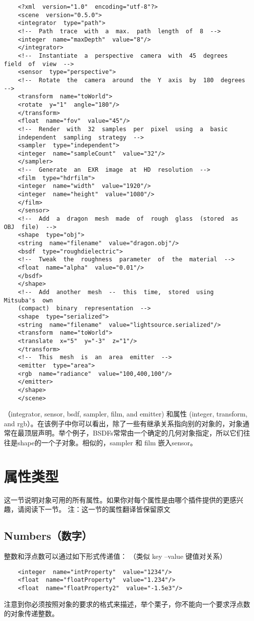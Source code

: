 \begin{lstlisting}
	<?xml  version="1.0"  encoding="utf-8"?>
	<scene  version="0.5.0">
	<integrator  type="path">
	<!--  Path  trace  with  a  max.  path  length  of  8  -->
	<integer  name="maxDepth"  value="8"/>
	</integrator>
	<!--  Instantiate  a  perspective  camera  with  45  degrees  field  of  view  -->
	<sensor  type="perspective">
	<!--  Rotate  the  camera  around  the  Y  axis  by  180  degrees  -->
	<transform  name="toWorld">
	<rotate  y="1"  angle="180"/>
	</transform>
	<float  name="fov"  value="45"/>
	<!--  Render  with  32  samples  per  pixel  using  a  basic
	independent  sampling  strategy  -->
	<sampler  type="independent">
	<integer  name="sampleCount"  value="32"/>
	</sampler>
	<!--  Generate  an  EXR  image  at  HD  resolution  -->
	<film  type="hdrfilm">
	<integer  name="width"  value="1920"/>
	<integer  name="height"  value="1080"/>
	</film>
	</sensor>
	<!--  Add  a  dragon  mesh  made  of  rough  glass  (stored  as  OBJ  file)  -->
	<shape  type="obj">
	<string  name="filename"  value="dragon.obj"/>
	<bsdf  type="roughdielectric">
	<!--  Tweak  the  roughness  parameter  of  the  material  -->
	<float  name="alpha"  value="0.01"/>
	</bsdf>
	</shape>
	<!--  Add  another  mesh  --  this  time,  stored  using  Mitsuba's  own
	(compact)  binary  representation  -->
	<shape  type="serialized">
	<string  name="filename"  value="lightsource.serialized"/>
	<transform  name="toWorld">
	<translate  x="5"  y="-3"  z="1"/>
	</transform>
	<!--  This  mesh  is  an  area  emitter  -->
	<emitter  type="area">
	<rgb  name="radiance"  value="100,400,100"/>
	</emitter>
	</shape>
	</scene>
\end{lstlisting}
（integrator, sensor, bsdf, sampler, film,
and emitter) 和属性 (integer, transform, and rgb）。在该例子中你可以看出，除了一些有继承关系指向别的对象的，对象通常在最顶层声明。举个例子，BSDFs常常由一个确定的几何对象指定，所以它们往往是shape的一个子对象。相似的，sampler 和 film 嵌入sensor。

\section{属性类型}
这一节说明对象可用的所有属性。如果你对每个属性是由哪个插件提供的更感兴趣，请阅读下一节。
注：这一节的属性翻译皆保留原文

\subsection{Numbers（数字）}
整数和浮点数可以通过如下形式传递值：
（类似 key –value 键值对关系）
\begin{lstlisting}
	<integer  name="intProperty"  value="1234"/>
	<float  name="floatProperty"  value="1.234"/>
	<float  name="floatProperty2"  value="-1.5e3"/>
\end{lstlisting}
注意到你必须按照对象的要求的格式来描述，举个栗子，你不能向一个要求浮点数的对象传递整数。

